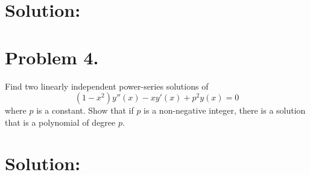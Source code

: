 \documentclass{pset}
\begin{document}
  \hrulefill

  \section*{Solution:}

  \clearpage


  \section*{Problem 4.}
    Find two linearly independent power-series solutions of
    \[
      (1 - x^2)y''(x) - xy'(x) + p^2y(x) = 0
    \]
    where $p$ is a constant. Show that if $p$ is a non-negative
    integer, there is a solution that is a polynomial of degree $p$.

  \hrulefill

  \section*{Solution:}

  \clearpage
\end{document}
